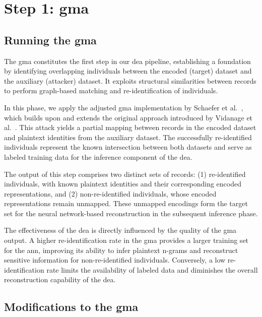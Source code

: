 \section{Step 1: \ac{gma}} \label{sec:deagma}

\subsection{Running the \ac{gma}} \label{sec:runninggma}

The \ac{gma} constitutes the first step in our \ac{dea} pipeline, establishing a foundation by identifying overlapping individuals between the encoded (target) dataset and the auxiliary (attacker) dataset.
It exploits structural similarities between records to perform graph-based matching and re-identification of individuals.

In this phase, we apply the adjusted \ac{gma} implementation by Schaefer et al.~\cite{schaefer2024}, which builds upon and extends the original approach introduced by Vidanage et al.~\cite{vidanage2020graph}.
This attack yields a partial mapping between records in the encoded dataset and plaintext identities from the auxiliary dataset.
The successfully re-identified individuals represent the known intersection between both datasets and serve as labeled training data for the inference component of the \ac{dea}.

The output of this step comprises two distinct sets of records:
(1) re-identified individuals, with known plaintext identities and their corresponding encoded representations, and
(2) non-re-identified individuals, whose encoded representations remain unmapped.
These unmapped encodings form the target set for the neural network-based reconstruction in the subsequent inference phase.

The effectiveness of the \ac{dea} is directly influenced by the quality of the \ac{gma} output.
A higher re-identification rate in the \ac{gma} provides a larger training set for the \ac{ann}, improving its ability to infer plaintext n-grams and reconstruct sensitive information for non-re-identified individuals.
Conversely, a low re-identification rate limits the availability of labeled data and diminishes the overall reconstruction capability of the \ac{dea}.

\subsection{Modifications to the \ac{gma}} \label{sec:modificationstogma}


